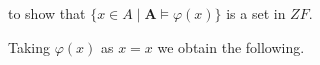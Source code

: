 to show that $\{x \in A \mid \mathbf{A} \models \varphi(x)\}$ is a set in $ZF$.

Taking $\varphi(x)$ as $x = x$ we obtain the following.
